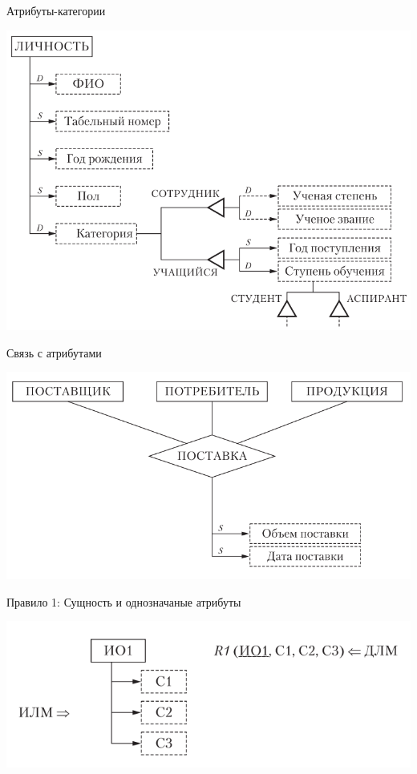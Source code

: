 \documentclass{beamer}
\begin{document}
\begin{frame}{Атрибуты-категории}
\begin{center}
\includegraphics[scale=0.5]{images/lec03-pic09.png}
\end{center}
\end{frame}

\begin{frame}{Связь с атрибутами}
\begin{center}
\includegraphics[scale=0.6]{images/lec03-pic10.png}
\end{center}
\end{frame}

\begin{frame}{Правило 1: Сущность и однозначаные атрибуты}
\begin{center}
\includegraphics[scale=0.7]{images/lec03-pic11.png}
\end{center}
\end{frame}
\end{document}
